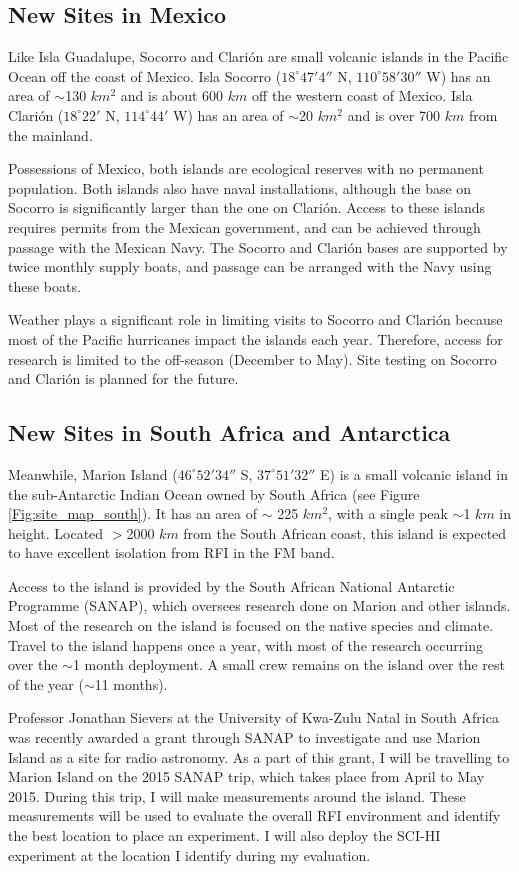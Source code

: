 \subsection{New Sites in Mexico}

Like Isla Guadalupe, Socorro and Clari\'{o}n are small volcanic islands in the Pacific Ocean off the coast of Mexico. Isla Socorro ($18^\circ 47' 4''$ N, $110^\circ 58' 30''$ W) has an area of $\sim$130 $km^2$ and is about 600 $km$ off the western coast of Mexico. Isla Clari\'{o}n ($18^\circ 22'$ N, $114^\circ 44'$ W) has an area of $\sim$20 $km^2$ and is over 700 $km$ from the mainland.

Possessions of Mexico, both islands are ecological reserves with no permanent population. Both islands also have naval installations, although the base on Socorro is significantly larger than the one on Clari\'{o}n. Access to these islands requires permits from the Mexican government, and can be achieved through passage with the Mexican Navy. The Socorro and Clari\'{o}n bases are supported by twice monthly supply boats, and passage can be arranged with the Navy using these boats. 

Weather plays a significant role in limiting visits to Socorro and Clari\'{o}n because most of the Pacific hurricanes impact the islands each year. Therefore, access for research is limited to the off-season (December to May). Site testing on Socorro and Clari\'{o}n is planned for the future.


\subsection{New Sites in South Africa and Antarctica} \label{Sec:SA_site}

Meanwhile, Marion Island ($46^\circ 52' 34''$ S, $37^\circ 51' 32''$ E) is a small volcanic island in the sub-Antarctic Indian Ocean owned by South Africa (see Figure \ref{Fig:site_map_south}). It has an area of $\sim$ 225 $km^2$, with a single peak $\sim$1 $km$ in height. Located $>$2000 $km$ from the South African coast, this island is expected to have excellent isolation from RFI in the FM band. 

Access to the island is provided by the South African National Antarctic Programme (SANAP), which oversees research done on Marion and other islands. Most of the research on the island is focused on the native species and climate. Travel to the island happens once a year, with most of the research occurring over the $\sim$1 month deployment. A small crew remains on the island over the rest of the year ($\sim$11 months). 

Professor Jonathan Sievers at the University of Kwa-Zulu Natal in South Africa was recently awarded a grant through SANAP to investigate and use Marion Island as a site for radio astronomy. As a part of this grant, I will be travelling to Marion Island on the 2015 SANAP trip, which takes place from April to May 2015. During this trip, I will make measurements around the island. These measurements will be used to evaluate the overall RFI environment and identify the best location to place an experiment. I will also deploy the SCI-HI experiment at the location I identify during my evaluation. 

